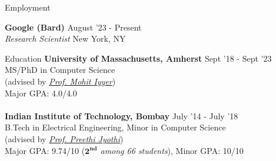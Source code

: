 \documentclass{resume} %
\begin{document}

\begin{rSection}{Employment}
\vspace*{0.1in}

{\bf Google (Bard)} { \hfill August '23 - Present}\\ \textit{Research Scientist} {\hfill New York, NY}

\end{rSection}

\begin{rSection}{Education}
\vspace*{0.1in}
{\bf University of Massachusetts, Amherst} \hfill {Sept '18 - Sept '23} \\ MS/PhD in Computer Science \\ (advised by \textit{\href{https://people.cs.umass.edu/~miyyer/}{Prof. Mohit Iyyer}}) \\
Major GPA: 4.0/4.0\\\\
{\bf Indian Institute of Technology, Bombay} \hfill {July '14 - July '18} \\ 
B.Tech in Electrical Engineering, Minor in Computer Science\\
(advised by \textit{\href{https://www.cse.iitb.ac.in/~pjyothi/}{Prof. Preethi Jyothi}})\\
Major GPA: 9.74/10 (\textit{$\mathbf{2^{nd}}$ among 66 students}), Minor GPA: 10/10
\end{rSection}
\end{document}
